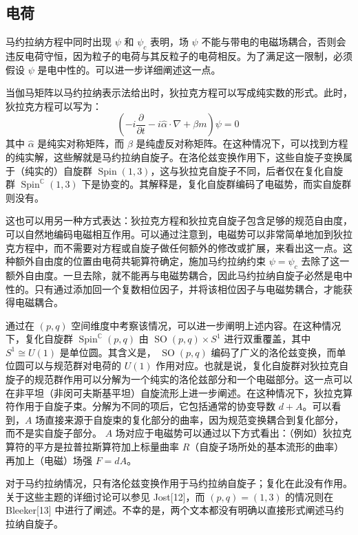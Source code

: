 \subsection{电荷}  
马约拉纳方程中同时出现 \( \psi \) 和 \( \psi_c \) 表明，场 \( \psi \) 不能与带电的电磁场耦合，否则会违反电荷守恒，因为粒子的电荷与其反粒子的电荷相反。为了满足这一限制，必须假设 \( \psi \) 是电中性的。可以进一步详细阐述这一点。

当伽马矩阵以马约拉纳表示法给出时，狄拉克方程可以写成纯实数的形式。此时，狄拉克方程可以写为：
\[
\left(-i \frac{\partial}{\partial t} - i \hat{\alpha} \cdot \nabla + \beta m \right)\psi = 0~
\]
其中 \( \hat{\alpha} \) 是纯实对称矩阵，而 \( \beta \) 是纯虚反对称矩阵。在这种情况下，可以找到方程的纯实解，这些解就是马约拉纳自旋子。在洛伦兹变换作用下，这些自旋子变换属于（纯实的）自旋群 \( \operatorname{Spin}(1,3) \)，这与狄拉克自旋子不同，后者仅在复化自旋群 \( \operatorname{Spin}^{\mathbb{C}}(1,3) \) 下是协变的。其解释是，复化自旋群编码了电磁势，而实自旋群则没有。

这也可以用另一种方式表达：狄拉克方程和狄拉克自旋子包含足够的规范自由度，可以自然地编码电磁相互作用。可以通过注意到，电磁势可以非常简单地加到狄拉克方程中，而不需要对方程或自旋子做任何额外的修改或扩展，来看出这一点。这种额外自由度的位置由电荷共轭算符确定，施加马约拉纳约束 \( \psi = \psi_c \) 去除了这一额外自由度。一旦去除，就不能再与电磁势耦合，因此马约拉纳自旋子必然是电中性的。只有通过添加回一个复数相位因子，并将该相位因子与电磁势耦合，才能获得电磁耦合。

通过在 \( (p,q) \) 空间维度中考察该情况，可以进一步阐明上述内容。在这种情况下，复化自旋群 \( \operatorname{Spin}^{\mathbb{C}}(p,q) \) 由 \( \operatorname{SO}(p,q) \times S^1 \) 进行双重覆盖，其中 \( S^1 \cong U(1) \) 是单位圆。其含义是， \( \operatorname{SO}(p,q) \) 编码了广义的洛伦兹变换，而单位圆可以与规范群对电荷的 \( U(1) \) 作用对应。也就是说，复化自旋群对狄拉克自旋子的规范群作用可以分解为一个纯实的洛伦兹部分和一个电磁部分。这一点可以在非平坦（非闵可夫斯基平坦）自旋流形上进一步阐述。在这种情况下，狄拉克算符作用于自旋子束。分解为不同的项后，它包括通常的协变导数 \( d + A \)。可以看到，\( A \) 场直接来源于自旋束的复化部分的曲率，因为规范变换耦合到复化部分，而不是实自旋子部分。 \( A \) 场对应于电磁势可以通过以下方式看出：（例如）狄拉克算符的平方是拉普拉斯算符加上标量曲率 \( R \)（自旋子场所处的基本流形的曲率）再加上（电磁）场强 \( F = dA \)。

对于马约拉纳情况，只有洛伦兹变换作用于马约拉纳自旋子；复化在此没有作用。关于这些主题的详细讨论可以参见 Jost[12]，而 \( (p,q) = (1,3) \) 的情况则在 Bleeker[13] 中进行了阐述。不幸的是，两个文本都没有明确以直接形式阐述马约拉纳自旋子。
